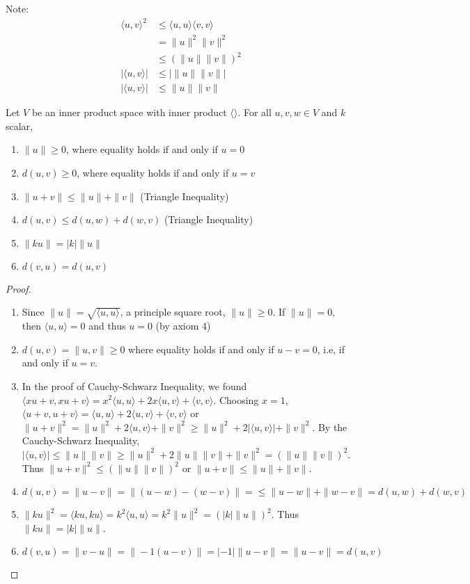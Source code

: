 \documentclass[12pt]{article}
\begin{document}
Note: $$\begin{aligned} \langle u , v \rangle^2 &\leq \langle u, u \rangle \langle v, v \rangle \\ &= \|u\|^2 \|v\|^2 \\ &\leq (\|u\| \|v\|)^2 \\ |\langle u, v \rangle | &\leq |\|u\| \|v\|| \\ |\langle u, v \rangle | &\leq \|u\| \|v\| \end{aligned} $$ 
\begin{theorem} Let $V$ be an inner product space with inner product $\langle \rangle$. For all $u, v, w \in V$ and $k$ scalar, \begin{enumerate} 
\item $\| u \| \geq 0$, where equality holds if and only if $u = 0$ \item $d(u, v) \geq 0$, where equality holds if and only if $u = v$ \item $\|u + v\| \leq \|u\| + \|v\| $ (Triangle Inequality) \item $d(u, v) \leq d(u, w) + d(w, v)$ (Triangle Inequality) \item $\|ku\| = |k|\|u\|$ \item $d(v, u) = d(u, v)$ \end{enumerate} \end{theorem}
\begin{proof} \begin{enumerate} \item Since $\|u\| = \sqrt{\langle u, u \rangle} $, a principle square root, $\|u\| \geq 0$. If $\|u\| = 0$, then $\langle u, u \rangle = 0$ and thus $u = 0$ (by axiom 4) \item $d(u, v) = \|u, v\| \geq 0$ where equality holds if and only if $u - v = 0$, i.e, if and only if $u = v$. \item In the proof of Cauchy-Schwarz Inequality, we found $\langle xu + v, xu + v \rangle = x^2\langle u, u \rangle + 2x\langle u, v \rangle + \langle v, v \rangle$. Choosing $x= 1$, $\langle u + v, u + v \rangle = \langle u, u \rangle + 2\langle u, v \rangle + \langle v, v \rangle$ or $\|u + v \|^2 = \|u\|^2 + 2\langle u, v \rangle + \|v\|^2 \geq \|u\|^2 + 2|\langle u, v \rangle| + \|v\|^2$. By the Cauchy-Schwarz Inequality, $| \langle u, v \rangle | \leq \|u\| \|v\| \geq \|u\|^2 + 2\|u\|\|v\| + \|v\|^2 = (\|u\| \|v\|)^2$. Thus $\|u + v\|^2 \leq (\|u\| \|v\|)^2$ or $\|u + v\| \leq \|u\| + \|v\|$. 
\item $d(u, v) = \|u - v\| = \|(u - w) - (w - v)\| = \leq \|u - w\| + \|w - v\| = d(u, w) + d(w, v)$ \item $\|ku\|^2 = \langle ku, ku \rangle = k^2 \langle u, u \rangle = k^2 \|u\|^2 = (|k|\|u\|)^2$. Thus $\|ku\| = |k|\|u\|$. \item $d(v, u) = \|v - u\| = \| -1(u - v)\| = |-1|\|u - v\| = \|u - v \| = d(u, v)$ \end{enumerate} \end{proof}
\end{document}
